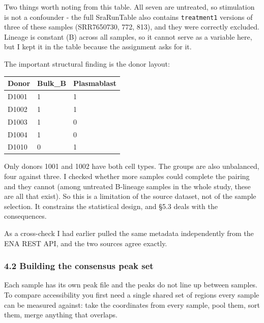 \documentclass[
  11pt,
  a4paper,
]{article}
\newenvironment{Shaded}{}{}
\newcommand{\AttributeTok}[1]{\textcolor[rgb]{0.49,0.56,0.16}{#1}}
\newcommand{\ControlFlowTok}[1]{\textcolor[rgb]{0.00,0.44,0.13}{\textbf{#1}}}
\newcommand{\ExtensionTok}[1]{#1}
\newcommand{\FunctionTok}[1]{\textcolor[rgb]{0.02,0.16,0.49}{#1}}
\newcommand{\KeywordTok}[1]{\textcolor[rgb]{0.00,0.44,0.13}{\textbf{#1}}}
\newcommand{\NormalTok}[1]{#1}
\newcommand{\OperatorTok}[1]{\textcolor[rgb]{0.40,0.40,0.40}{#1}}
\newcommand{\StringTok}[1]{\textcolor[rgb]{0.25,0.44,0.63}{#1}}
\newcommand{\VariableTok}[1]{\textcolor[rgb]{0.10,0.09,0.49}{#1}}
\begin{document}
Two things worth noting from this table. All seven are untreated, so
stimulation is not a confounder - the full SraRunTable also contains
\texttt{treatment1} versions of three of these samples (SRR7650730, 772,
813), and they were correctly excluded. Lineage is constant (B) across
all samples, so it cannot serve as a variable here, but I kept it in the
table because the assignment asks for it.

The important structural finding is the donor layout:

\begin{longtable}[]{@{}lll@{}}
\toprule\noalign{}
Donor & Bulk\_B & Plasmablast \\
\midrule\noalign{}
\endhead
\bottomrule\noalign{}
\endlastfoot
D1001 & 1 & 1 \\
D1002 & 1 & 1 \\
D1003 & 1 & 0 \\
D1004 & 1 & 0 \\
D1010 & 0 & 1 \\
\end{longtable}

Only donors 1001 and 1002 have both cell types. The groups are also
unbalanced, four against three. I checked whether more samples could
complete the pairing and they cannot (among untreated B-lineage samples
in the whole study, these are all that exist). So this is a limitation
of the source dataset, not of the sample selection. It constrains the
statistical design, and §5.3 deals with the consequences.

As a cross-check I had earlier pulled the same metadata independently
from the ENA REST API, and the two sources agree exactly.

\hypertarget{building-the-consensus-peak-set}{%
\subsubsection{4.2 Building the consensus peak
set}\label{building-the-consensus-peak-set}}

Each sample has its own peak file and the peaks do not line up between
samples. To compare accessibility you first need a single shared set of
regions every sample can be measured against: take the coordinates from
every sample, pool them, sort them, merge anything that overlaps.

\begin{Shaded}
\end{Shaded}
\end{document}

